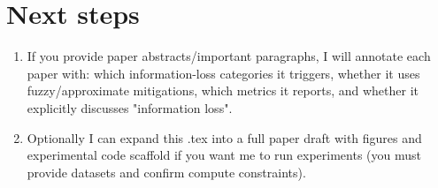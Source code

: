 \documentclass{article}
\begin{document}
\section*{Next steps}
\begin{enumerate}
  \item If you provide paper abstracts/important paragraphs, I will annotate each paper with: which information-loss categories it triggers, whether it uses fuzzy/approximate mitigations, which metrics it reports, and whether it explicitly discusses "information loss".\
  \item Optionally I can expand this .tex into a full paper draft with figures and experimental code scaffold if you want me to run experiments (you must provide datasets and confirm compute constraints).
\end{enumerate}
\end{document}
